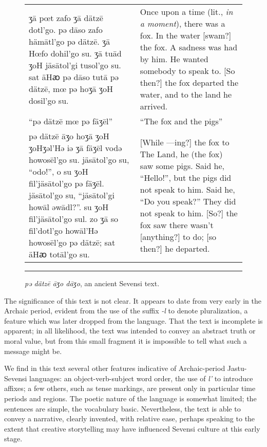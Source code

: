 \begin{figure}[ht]

\centering\small

\begin{tabular}{p{200pt}p{200pt}}
{\raggedleft ʒā pœt zafo ʒā dätzē dotl’go.
pǝ dāso zafo hämātl’go pǝ dätzē.
ʒā Hœfo dohil'go su.
ʒā tuād ʒoH jäsātol’gi tusol’go su.
sat äHꜵ pǝ dāso tutā pǝ dätzē, mœ pǝ hoʒā ʒoH dosil’go su.\par}
&{\raggedright Once upon a time (lit., \emph{in a moment}), there was a fox.
In the water [swam?] the fox.
A sadness was had by him.
He wanted somebody to speak to.
[So then?] the fox departed the water, and to the land he arrived.\par}
\\{\raggedleft “pə dätzē mœ pə fäʒēl”\par}
&{\raggedright “The fox and the pigs”\par}
\\{\raggedleft pə dätzē āʒo hoʒā ʒoH ʒoHʒəl'Hə iə ʒā fäʒēl vodə howosēl'go su.
jäsātol'go su, “odo!”, o su ʒoH fil'jäsātol'go pə fäʒēl.
jäsātol'go su, “jäsātol'gi howāl əwādl?”.
su ʒoH fil'jäsātol'go sul.
zo ʒā so fil'dotl'go howāl'Hə howosēl'go pə dätzē; sat äHꜵ totāl'go su.\par}
&{\raggedright [While —ing?] the fox to The Land, he (the fox) saw some pigs.
Said he, “Hello!”, but the pigs did not speak to him.
Said he, “Do you speak?”
They did not speak to him.
[So?] the fox saw there wasn't [anything?] to do; [so then?] he departed.\par}
\end{tabular}

\caption{\emph{pə dätzē āʒo dāʒo}, an ancient Sevensi text.}
\label{archaic-translation}

\medskip\hrule

\end{figure}

The significance of this text is not clear.
It appears to date from very early in the Archaic period, evident from the use of the suffix \emph{-l} to denote pluralization, a feature which was later dropped from the language.
That the text is incomplete is apparent; in all likelihood, the text was intended to convey an abstract truth or moral value, but from this small fragment it is impossible to tell what such a message might be.

We find in this text several other features indicative of Archaic-period Jastu-Sevensi languages: an object-verb-subject word order, the use of \emph{l'} to introduce affixes; a few others, such as tense markings, are present only in particular time periods and regions.
The poetic nature of the language is somewhat limited; the sentences are simple, the vocabulary basic.
Nevertheless, the text is able to convey a narrative, clearly invented, with relative ease, perhaps speaking to the extent that creative storytelling may have influenced Sevensi culture at this early stage.

